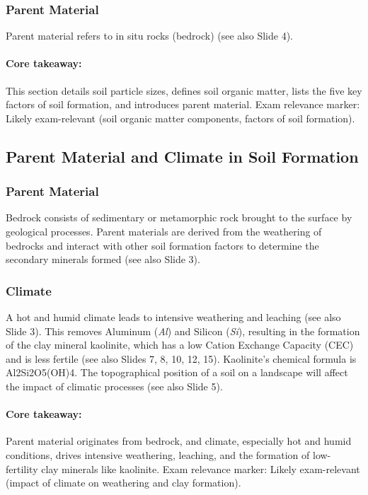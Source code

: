 \subsubsection*{Parent Material} 
Parent material refers to in situ rocks (bedrock) (see also Slide 4).

\paragraph*{Core takeaway:} 
This section details soil particle sizes, defines soil organic matter, lists the five key factors of soil formation, and introduces parent material. Exam relevance marker: Likely exam-relevant (soil organic matter components, factors of soil formation).

\subsection{Parent Material and Climate in Soil Formation} \subsubsection*{Parent Material} 
Bedrock consists of sedimentary or metamorphic rock brought to the surface by geological processes. Parent materials are derived from the weathering of bedrocks and interact with other soil formation factors to determine the secondary minerals formed (see also Slide 3).

\subsubsection*{Climate} A hot and humid climate leads to intensive weathering and leaching (see also Slide 3). This removes Aluminum (\textit{Al}) and Silicon (\textit{Si}), resulting in the formation of the clay mineral kaolinite, which has a low Cation Exchange Capacity (CEC) and is less fertile (see also Slides 7, 8, 10, 12, 15). Kaolinite's chemical formula is Al2Si2O5(OH)4. The topographical position of a soil on a landscape will affect the impact of climatic processes (see also Slide 5).

\paragraph*{Core takeaway:} 
Parent material originates from bedrock, and climate, especially hot and humid conditions, drives intensive weathering, leaching, and the formation of low-fertility clay minerals like kaolinite. Exam relevance marker: Likely exam-relevant (impact of climate on weathering and clay formation).

